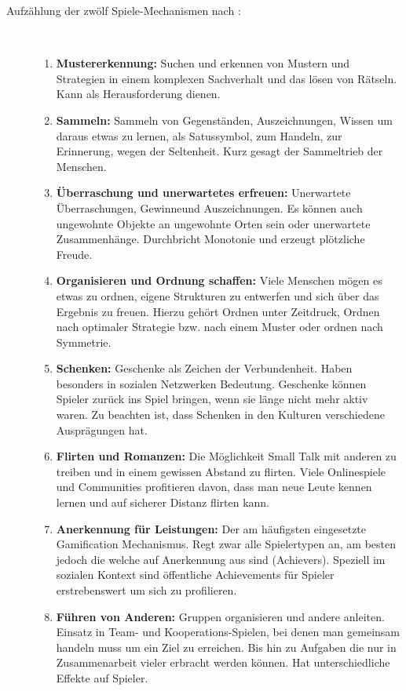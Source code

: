 \documentclass[a4paper,12pt]{scrartcl}
\begin{document}
\begin{description}
   \item[Aufzählung der zwölf Spiele-Mechanismen nach \cite{Zichermann2011}:]~\par
   \begin{enumerate}
      \item \textbf{Mustererkennung:} Suchen und erkennen von Mustern und Strategien in einem komplexen Sachverhalt und das lösen von Rätseln. Kann als Herausforderung dienen.
      \item \textbf{Sammeln:} Sammeln von Gegenständen, Auszeichnungen, Wissen um daraus etwas zu lernen, als Satussymbol, zum Handeln, zur Erinnerung, wegen der Seltenheit. Kurz gesagt der Sammeltrieb der Menschen.
      \item \textbf{Überraschung und unerwartetes erfreuen:} Unerwartete Überraschungen, Gewinneund Auszeichnungen. Es können auch ungewohnte Objekte an ungewohnte Orten sein oder unerwartete Zusammenhänge. Durchbricht Monotonie und erzeugt plötzliche Freude. 
      \item \textbf{Organisieren und Ordnung schaffen:} Viele Menschen mögen es etwas zu ordnen, eigene Strukturen zu entwerfen und sich über das Ergebnis zu freuen. Hierzu gehört Ordnen unter Zeitdruck, Ordnen nach optimaler Strategie bzw. nach einem Muster oder ordnen nach Symmetrie.
      \item \textbf{Schenken:} Geschenke als Zeichen der Verbundenheit. Haben besonders in sozialen Netzwerken Bedeutung. Geschenke können Spieler zurück ins Spiel bringen, wenn sie länge nicht mehr aktiv waren. Zu beachten ist, dass Schenken in den Kulturen verschiedene Ausprägungen hat.
      \item \textbf{Flirten und Romanzen:} Die Möglichkeit Small Talk mit anderen zu treiben und in einem gewissen Abstand zu flirten. Viele Onlinespiele und Communities profitieren davon, dass man neue Leute kennen lernen und auf sicherer Distanz flirten kann.
      \item \textbf{Anerkennung für Leistungen:} Der am häufigsten eingesetzte Gamification Mechanismus. Regt zwar alle Spielertypen an, am besten jedoch die welche auf Anerkennung aus sind (Achievers). Speziell im sozialen Kontext sind öffentliche Achievements für Spieler erstrebenswert um sich zu profilieren.
      \item \textbf{Führen von Anderen:} Gruppen organisieren und andere anleiten. Einsatz in Team- und Kooperations-Spielen, bei denen man gemeinsam handeln muss um ein Ziel zu erreichen. Bis hin zu Aufgaben die nur in Zusammenarbeit vieler erbracht werden können. Hat unterschiedliche Effekte auf Spieler.  

\end{enumerate}
\end{description}
\end{document}
